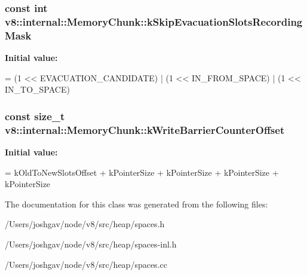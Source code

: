 \subsubsection[{\texorpdfstring{k\+Skip\+Evacuation\+Slots\+Recording\+Mask}{kSkipEvacuationSlotsRecordingMask}}]{\setlength{\rightskip}{0pt plus 5cm}const int v8\+::internal\+::\+Memory\+Chunk\+::k\+Skip\+Evacuation\+Slots\+Recording\+Mask\hspace{0.3cm}{\ttfamily [static]}}\hypertarget{classv8_1_1internal_1_1_memory_chunk_ac21cadcf39d0971633fd4d18b92969a8}{}\label{classv8_1_1internal_1_1_memory_chunk_ac21cadcf39d0971633fd4d18b92969a8}
{\bfseries Initial value\+:}
\begin{DoxyCode}
=
      (1 << EVACUATION\_CANDIDATE) | (1 << IN\_FROM\_SPACE) | (1 << IN\_TO\_SPACE)
\end{DoxyCode}
\subsubsection[{\texorpdfstring{k\+Write\+Barrier\+Counter\+Offset}{kWriteBarrierCounterOffset}}]{\setlength{\rightskip}{0pt plus 5cm}const size\+\_\+t v8\+::internal\+::\+Memory\+Chunk\+::k\+Write\+Barrier\+Counter\+Offset\hspace{0.3cm}{\ttfamily [static]}}\hypertarget{classv8_1_1internal_1_1_memory_chunk_a069188cd704a43e4fcce7cf0688f1665}{}\label{classv8_1_1internal_1_1_memory_chunk_a069188cd704a43e4fcce7cf0688f1665}
{\bfseries Initial value\+:}
\begin{DoxyCode}
=
      kOldToNewSlotsOffset + kPointerSize  
      + kPointerSize                       
      + kPointerSize   
      + kPointerSize
\end{DoxyCode}


The documentation for this class was generated from the following files\+:\begin{DoxyCompactItemize}
\item 
/\+Users/joshgav/node/v8/src/heap/spaces.\+h\item 
/\+Users/joshgav/node/v8/src/heap/spaces-\/inl.\+h\item 
/\+Users/joshgav/node/v8/src/heap/spaces.\+cc\end{DoxyCompactItemize}
